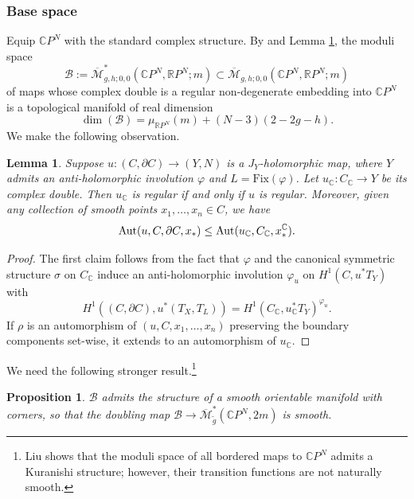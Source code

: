 \documentclass[11pt,psamsfonts, oneside, reqno]{amsart}
\newcommand{\sub}{\subset}%
\newcommand{\cl}{\colon}
\newcommand{\Mbar}{\overline{\mathcal M}}
\newcommand{\del}{\partial}
\newcommand{\Aut}{\normalfont\text{Aut}}
\newcommand{\bC}{\mathbb{C}}
\newcommand{\bR}{\mathbb{R}}
\newcommand{\cB}{\mathcal{B}}
\newtheorem{lemma}[theorem]{Lemma}
\newtheorem{proposition}[theorem]{Proposition}
\theoremstyle{definition}
\theoremstyle{remark}
\numberwithin{equation}{section}
\begin{document}
\subsubsection{Base space}\label{subsec:base-space}
Equip $\bC P^N$ with the standard complex structure. By \cite[Theorem 1.2]{Liu20} and Lemma \ref{lem:doubling-preserves-regularity}, the moduli space 
\begin{equation}\label{eq:base-space}\cB:= \Mbar_{g,h;0,0}^{*}(\bC P^N,\bR P^N;m)\sub \Mbar_{g,h;0,0}(\bC P^N,\bR P^N;m) \end{equation}
of maps whose complex double is a regular non-degenerate embedding into $\bC P^N$ is a topological manifold of real dimension
$$\dim(\cB) = \mu_{\bR P^N}(m) + (N-3)(2-2g-h).$$\noindent
We make the following observation.

\begin{lemma}\label{lem:doubling-preserves-regularity} Suppose $u \cl (C,\del C)\to (Y,N)$ is a $J_Y$-holomorphic map, where $Y$ admits an anti-holomorphic involution $\varphi$ and $L = \text{Fix}(\varphi)$. Let $u_\bC\cl C_\bC\to Y$ be its complex double. Then $u_\bC$ is regular if and only if $u$ is regular. Moreover, given any collection of smooth points $x_1,\dots,x_n\in C$, we have 
	$$\Aut(u,C,\del C,x_*) \leq \Aut(u_\bC,C_\bC,x^\bC_*).$$
\end{lemma}

\begin{proof}
	The first claim follows from the fact that $\varphi$ and the canonical symmetric structure $\sigma$ on $C_\bC$ induce an anti-holomorphic involution $\varphi_u$ on $H^1(C,u^*T_Y)$ with 
	$$H^1((C,\del C),u^*(T_X,T_L)) = H^1(C_\bC,u_\bC^*T_Y)^{\varphi_u}.$$\noindent
	If $\rho$ is an automorphism of $(u,C,x_1,\dots,x_n)$ preserving the boundary components set-wise, it extends to an automorphism of $u_\bC$.
\end{proof}
\noindent
We need the following stronger result.\footnote{Liu shows that the moduli space of all bordered maps to $\bC P^N$ admits a Kuranishi structure; however, their transition functions are not naturally smooth.} 

\begin{proposition}\label{prop:base-space} $\cB$ admits the structure of a smooth orientable manifold with corners, so that the doubling map $\cB\to \Mbar_{\tilde{g}}^*(\bC P^N,2m)$ is smooth.\end{proposition}
\end{document}
